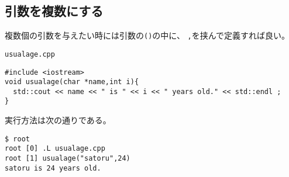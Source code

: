   \subsection{引数を複数にする}
  複数個の引数を与えたい時には引数の\verb|()|の中に、
  \verb|,|を挟んで定義すれば良い。
  \begin{itembox}{\texttt{usualage.cpp}}
\begin{verbatim}
#include <iostream>
void usualage(char *name,int i){
  std::cout << name << " is " << i << " years old." << std::endl ;
}
\end{verbatim}
  \end{itembox}
実行方法は次の通りである。
\begin{verbatim}
$ root
root [0] .L usualage.cpp 
root [1] usualage("satoru",24)
satoru is 24 years old.
\end{verbatim}